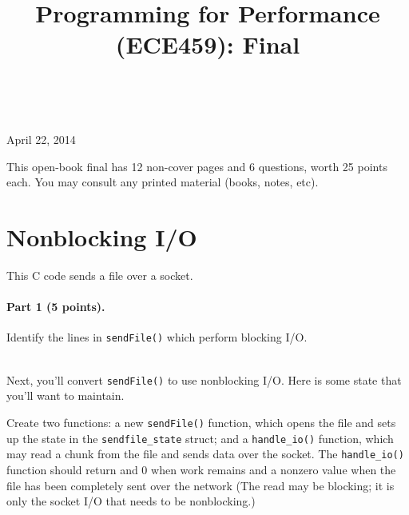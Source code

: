\documentclass[12pt]{article}
\begin{document}
\title{Programming for Performance (ECE459): Final}
\author{}
\renewcommand{\today}{}
\maketitle

 ~\\[-8em]

\begin{center}
{\Large April 22, 2014}
\end{center}

This open-book final has 12 non-cover pages and 6 questions, worth 25 points each. You may consult any printed
material (books, notes, etc).

\section{Nonblocking I/O}

This C code sends a file over a socket.


\paragraph{Part 1 (5 points).} Identify the lines in {\tt sendFile()}
which perform blocking I/O.

~\\

\noindent
Next, you'll convert {\tt sendFile()} to use nonblocking
I/O. Here is some state that you'll want to maintain.


Create two functions: a new {\tt sendFile()} function,
which opens the file and sets up the state in the {\tt sendfile\_state}
struct; and a {\tt handle\_io()} function, which may read a chunk
from the file and sends data over the socket. The {\tt handle\_io()} function
should return and 0 when work remains and a nonzero value
when the file has been completely sent over the network 
(The read may be blocking;
it is only the socket I/O that needs to be nonblocking.)
 

\end{document}
